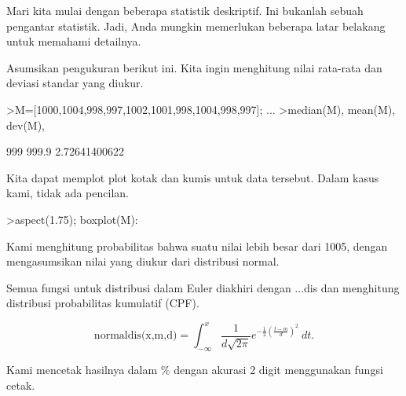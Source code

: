 \documentclass[a4paper,10pt]{article}
\begin{document}
\begin{eulernotebook}
\begin{eulercomment}
\begin{eulercomment}
\begin{eulercomment}
\begin{eulercomment}
\begin{eulercomment}
\begin{eulercomment}
\begin{eulercomment}
\begin{eulercomment}
\begin{eulercomment}
\begin{eulercomment}
\begin{eulercomment}
\begin{eulercomment}
\begin{eulercomment}
\begin{eulercomment}
\begin{eulercomment}
\begin{eulercomment}
\begin{eulercomment}
\begin{eulercomment}
\begin{eulercomment}
Mari kita mulai dengan beberapa statistik deskriptif. Ini bukanlah
sebuah pengantar statistik. Jadi, Anda mungkin memerlukan beberapa
latar belakang untuk memahami detailnya.

Asumsikan pengukuran berikut ini. Kita ingin menghitung nilai
rata-rata dan deviasi standar yang diukur.

\end{eulercomment}
\begin{eulerprompt}
>M=[1000,1004,998,997,1002,1001,998,1004,998,997]; ...
>median(M), mean(M), dev(M),
\end{eulerprompt}
\begin{euleroutput}
  999
  999.9
  2.72641400622
\end{euleroutput}
\begin{eulercomment}
Kita dapat memplot plot kotak dan kumis untuk data tersebut. Dalam
kasus kami, tidak ada pencilan.
\end{eulercomment}
\begin{eulerprompt}
>aspect(1.75); boxplot(M):
\end{eulerprompt}
\begin{eulercomment}
Kami menghitung probabilitas bahwa suatu nilai lebih besar dari 1005,
dengan mengasumsikan nilai yang diukur dari distribusi normal.

Semua fungsi untuk distribusi dalam Euler diakhiri dengan ...dis dan
menghitung distribusi probabilitas kumulatif (CPF).

\end{eulercomment}
\begin{eulerformula}
\[
\text{normaldis(x,m,d)}=\int_{-\infty}^x \frac{1}{d\sqrt{2\pi}}e^{-\frac{1}{2}(\frac{t-m}{d})^2}\ dt.
\]
\end{eulerformula}
\begin{eulercomment}
Kami mencetak hasilnya dalam \% dengan akurasi 2 digit menggunakan
fungsi cetak.


\end{eulercomment}
\end{eulercomment}
\end{eulercomment}
\end{eulercomment}
\end{eulercomment}
\end{eulercomment}
\end{eulercomment}
\end{eulercomment}
\end{eulercomment}
\end{eulercomment}
\end{eulercomment}
\end{eulercomment}
\end{eulercomment}
\end{eulercomment}
\end{eulercomment}
\end{eulercomment}
\end{eulercomment}
\end{eulercomment}
\end{eulercomment}
\end{eulernotebook}
\end{document}
